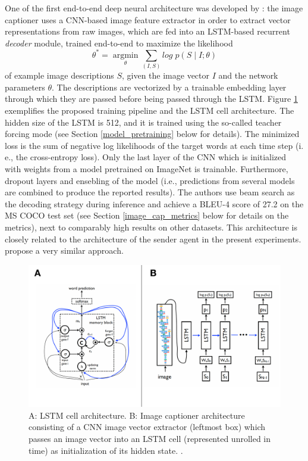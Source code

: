 One of the first end-to-end deep neural architecture was developed by \cite{vinyals2015show}: the image captioner uses a CNN-based image feature extractor in order to extract vector representations from raw images, which are fed into an LSTM-based recurrent \textit{decoder} module, trained end-to-end to maximize the likelihood 
\begin{equation}
\theta^* = \operatorname*{argmin}_\theta \sum_{(I, S)} log\; p(S \mid I; \theta) 
\end{equation}
of example image descriptions $S$, given the image vector $I$ and the network parameters $\theta$. The descriptions are vectorized by a trainable embedding layer through which they are passed before being passed through the LSTM. Figure \ref{fig:lstm} exemplifies the proposed training pipeline and the LSTM cell architecture. The hidden size of the LSTM is 512, and it is trained using the so-called teacher forcing mode (see Section \ref{model_pretraining} below for details). The minimized loss is the sum of negative log likelihoods of the target words at each time step (i. e., the cross-entropy loss). Only the last layer of the CNN which is initialized with weights from a model pretrained on ImageNet is trainable. Furthermore, dropout layers and ensebling of the model (i.e., predictions from several models are combined to produce the reported results). The authors use beam search as the decoding strategy during inference and achieve a BLEU-4 score of 27.2 on the MS COCO test set (see Section \ref{image_cap_metrics} below for details on the metrics), next to comparably high results on other datasets. 
This architecture is closely related to the architecture of the sender agent in the present experiments. \cite{donahue2015long} propose a very similar approach.

\begin{figure}
	\centering
	\includegraphics[width=\linewidth]{images/vinyals_lstm.pdf}
	\caption{A: LSTM cell architecture. B: Image captioner architecture consisting of a CNN image vector extractor (leftmost box) which passes an image vector into an LSTM cell (represented unrolled in time) as initialization of its hidden state. \parencite[][p. 2--3]{vinyals2015show}.}
	\label{fig:lstm}
\end{figure}

